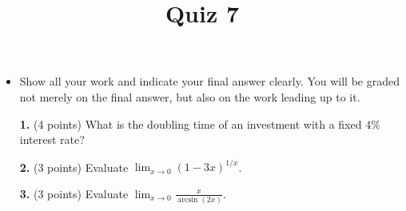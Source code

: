 \documentclass[12pt]{amsart}
\title{Quiz 7}%
\begin{document}
\maketitle
\thispagestyle{fancy}

\begin{itemize}
\item Show all your work and indicate your final
answer clearly. You will be graded not merely on the final answer, but also on the work leading up to it.
\end{itemize}
\vskip0.25in
\begin{enumerate}


\item[\textbf{1. }] (4 points) What is the doubling time of an investment with a fixed $4\%$ interest rate?


\vskip 2in

\item[\textbf{2. }](3 points) Evaluate $\displaystyle \lim_{x \to 0} (1 - 3x)^{1/x}$.
 
\vskip 2in

\item[\textbf{3. }] (3 points) Evaluate $\displaystyle \lim_{x \to 0} \frac {x} {\arcsin(2x)}$.


\end{enumerate}
\end{document}
